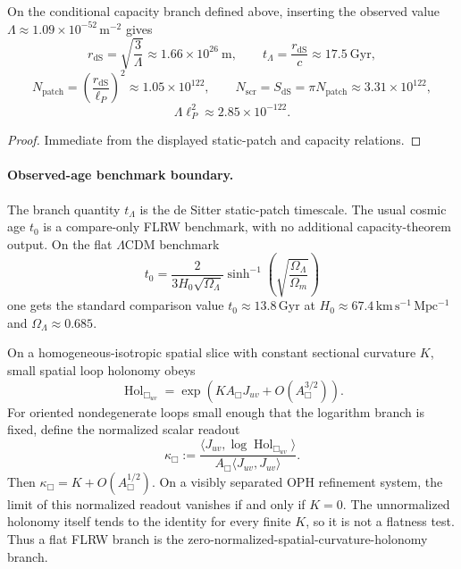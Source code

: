 \begin{corollary}\label{cor:lambda-benchmark}
On the conditional capacity branch defined above, inserting the observed value \(\Lambda\approx 1.09\times 10^{-52}\,\mathrm{m^{-2}}\) gives
\[
r_{\mathrm{dS}}=\sqrt{\frac{3}{\Lambda}}\approx 1.66\times 10^{26}\ \mathrm{m},
\qquad
t_\Lambda=\frac{r_{\mathrm{dS}}}{c}\approx 17.5\ \mathrm{Gyr},
\]
\[
N_{\mathrm{patch}}=\left(\frac{r_{\mathrm{dS}}}{\ell_P}\right)^2
\approx 1.05\times 10^{122},
\qquad
N_{\mathrm{scr}}=S_{\mathrm{dS}}=\pi N_{\mathrm{patch}}
\approx 3.31\times 10^{122},
\]
\[
\Lambda\ell_P^2\approx 2.85\times10^{-122}.
\]
\end{corollary}

\begin{proof}
Immediate from the displayed static-patch and capacity relations.
\end{proof}

\paragraph{Observed-age benchmark boundary.}
The branch quantity \(t_\Lambda\) is the de Sitter static-patch timescale. The usual cosmic age \(t_0\) is a compare-only FLRW benchmark, with no additional capacity-theorem output. On the flat \(\Lambda\)CDM benchmark
\[
t_0=\frac{2}{3H_0\sqrt{\Omega_\Lambda}}
\sinh^{-1}\!\left(\sqrt{\frac{\Omega_\Lambda}{\Omega_m}}\right)
\]
one gets the standard comparison value \(t_0\approx 13.8\,\mathrm{Gyr}\) at
\(H_0\approx 67.4\,\mathrm{km\,s^{-1}\,Mpc^{-1}}\) and \(\Omega_\Lambda\approx 0.685\).

\begin{lemma}
On a homogeneous-isotropic spatial slice with constant sectional curvature \(K\), small spatial
loop holonomy obeys
\[
\operatorname{Hol}_{\Box_{uv}}=\exp\!\left(KA_\Box J_{uv}+O(A_\Box^{3/2})\right).
\]
For oriented nondegenerate loops small enough that the logarithm branch is
fixed, define the normalized scalar readout
\[
\kappa_\Box
:=
\frac{\langle J_{uv},\log\operatorname{Hol}_{\Box_{uv}}\rangle}
     {A_\Box\langle J_{uv},J_{uv}\rangle}.
\]
Then \(\kappa_\Box=K+O(A_\Box^{1/2})\). On a visibly separated OPH refinement
system, the limit of this normalized readout vanishes if and only if \(K=0\).
The unnormalized holonomy itself tends to the identity for every finite
\(K\), so it is not a flatness test. Thus a flat FLRW branch is the
zero-normalized-spatial-curvature-holonomy branch.
\end{lemma}

